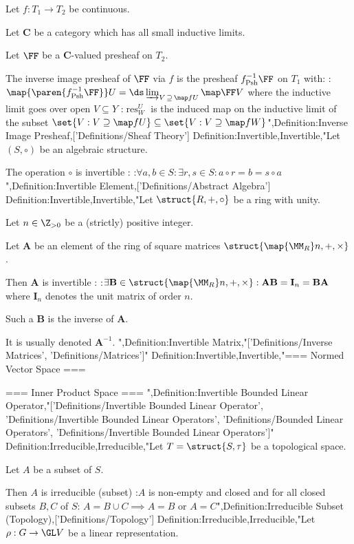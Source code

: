 Let $f: T_1 \to T_2$ be continuous.

Let $\mathbf C$ be a category which has all small inductive limits.

Let $\FF$ be a $\mathbf C$-valued presheaf on $T_2$.


The inverse image presheaf of $\FF$ via $f$ is the presheaf $f^{-1}_{\operatorname {Psh} } \FF$ on $T_1$ with:
:$\map {\paren {f^{-1}_{\operatorname{Psh} } \FF} } U = \ds \varinjlim_{V \mathop \supseteq \map f U} \map \FF V$ where the inductive limit goes over open $V \subseteq Y$
:$\operatorname {res}^U_W$ is the induced map on the inductive limit of the subset $\set {V: V \supseteq \map f U} \subseteq \set {V : V \supseteq \map f W}$",Definition:Inverse Image Presheaf,['Definitions/Sheaf Theory']
Definition:Invertible,Invertible,"Let $\left({S, \circ}\right)$ be an algebraic structure.


The operation $\circ$ is invertible :
:$\forall a, b \in S: \exists r, s \in S: a \circ r = b = s \circ a$
",Definition:Invertible Element,['Definitions/Abstract Algebra']
Definition:Invertible,Invertible,"Let $\struct {R, +, \circ}$ be a ring with unity.

Let $n \in \Z_{>0}$ be a (strictly) positive integer.

Let $\mathbf A$ be an element of the ring of square matrices $\struct {\map {\MM_R} n, +, \times}$.


Then $\mathbf A$ is invertible :
:$\exists \mathbf B \in \struct {\map {\MM_R} n, +, \times}: \mathbf A \mathbf B = \mathbf I_n = \mathbf B \mathbf A$
where $\mathbf I_n$ denotes the unit matrix of order $n$.


Such a $\mathbf B$ is the inverse of $\mathbf A$.

It is usually denoted $\mathbf A^{-1}$.
",Definition:Invertible Matrix,"['Definitions/Inverse Matrices', 'Definitions/Matrices']"
Definition:Invertible,Invertible,"=== Normed Vector Space ===
 

=== Inner Product Space ===
",Definition:Invertible Bounded Linear Operator,"['Definitions/Invertible Bounded Linear Operator', 'Definitions/Invertible Bounded Linear Operators', 'Definitions/Bounded Linear Operators', 'Definitions/Invertible Bounded Linear Operators']"
Definition:Irreducible,Irreducible,"Let $T = \struct {S, \tau}$ be a topological space.

Let $A$ be a subset of $S$.


Then $A$ is irreducible (subset) 
:$A$ is non-empty and closed and for all closed subsets $B, C$ of $S$: $A = B \cup C \implies A = B$ or $A = C$",Definition:Irreducible Subset (Topology),['Definitions/Topology']
Definition:Irreducible,Irreducible,"Let $\rho: G \to \GL V$ be a linear representation.

